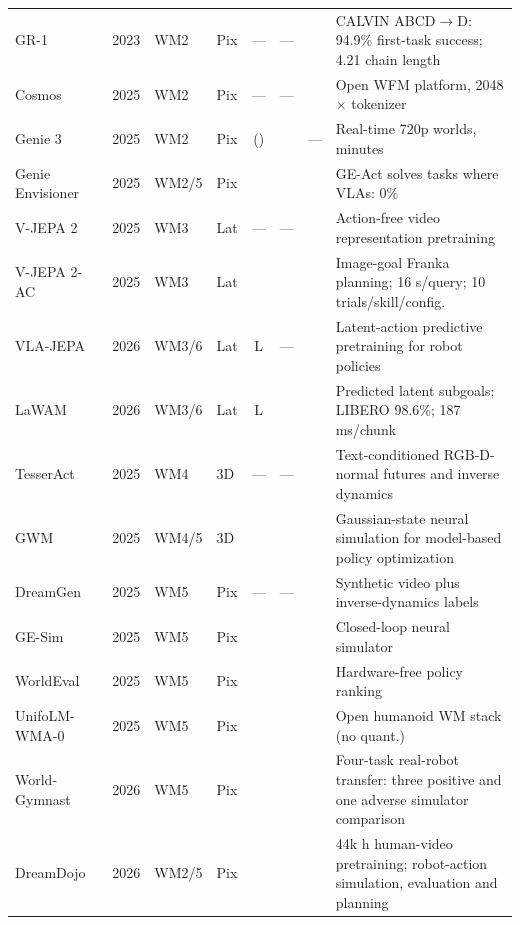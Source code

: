 \documentclass{ieeeaccess}
\newcommand{\cmark}{\ding{51}}
\begin{document}
\begin{table}[!t]
\begin{tabular}{p{2.7cm}p{1.35cm}p{0.9cm}p{1.2cm}cccp{5.9cm}}
GR-1~\cite{gr1} & 2023 & WM2 & Pix & --- & --- & \cmark & CALVIN ABCD$\to$D: 94.9\% first-task success; 4.21 chain length \\
Cosmos~\cite{cosmos} & 2025 & WM2 & Pix & --- & --- & \cmark & Open WFM platform, 2048$\times$ tokenizer \\
Genie 3~\cite{genie3} & 2025 & WM2 & Pix & (\cmark) & \cmark & --- & Real-time 720p worlds, minutes \\
Genie Envisioner~\cite{genieenvisioner} & 2025 & WM2/5 & Pix & \cmark & \cmark & \cmark & GE-Act solves tasks where VLAs: 0\% \\
V-JEPA 2~\cite{vjepa2} & 2025 & WM3 & Lat & --- & --- & \cmark & Action-free video representation pretraining \\
V-JEPA 2-AC~\cite{vjepa2} & 2025 & WM3 & Lat & \cmark & \cmark & \cmark & Image-goal Franka planning; 16 s/query; 10 trials/skill/config. \\
VLA-JEPA~\cite{jepavla} & 2026 & WM3/6 & Lat & L & --- & \cmark & Latent-action predictive pretraining for robot policies \\
LaWAM~\cite{lawam} & 2026 & WM3/6 & Lat & L & \cmark & \cmark & Predicted latent subgoals; LIBERO 98.6\%; 187 ms/chunk \\
TesserAct~\cite{tesseract} & 2025 & WM4 & 3D & --- & --- & \cmark & Text-conditioned RGB-D-normal futures and inverse dynamics \\
GWM~\cite{gaussianworld} & 2025 & WM4/5 & 3D & \cmark & \cmark & \cmark & Gaussian-state neural simulation for model-based policy optimization \\
DreamGen~\cite{dreamgen} & 2025 & WM5 & Pix & --- & --- & \cmark & Synthetic video plus inverse-dynamics labels \\
GE-Sim~\cite{genieenvisioner} & 2025 & WM5 & Pix & \cmark & \cmark & \cmark & Closed-loop neural simulator \\
WorldEval~\cite{policyeval} & 2025 & WM5 & Pix & \cmark & \cmark & \cmark & Hardware-free policy ranking \\
UnifoLM-WMA-0~\cite{unifolm} & 2025 & WM5 & Pix & \cmark & \cmark & \cmark & Open humanoid WM stack (no quant.) \\
World-Gymnast~\cite{sharma2026worldgymnast} & 2026 & WM5 & Pix & \cmark & \cmark & \cmark & Four-task real-robot transfer: three positive and one adverse simulator comparison \\
DreamDojo~\cite{dreamdojo} & 2026 & WM2/5 & Pix & \cmark & \cmark & \cmark & 44k h human-video pretraining; robot-action simulation, evaluation and planning \\

\end{tabular}
\end{table}
\end{document}
